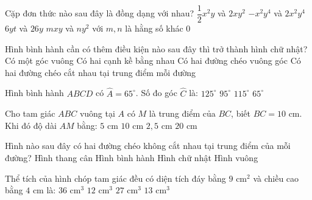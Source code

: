 \documentclass[12pt,a4paper]{article}
\begin{document}
\begin{ex}
Cặp đơn thức nào sau đây là đồng dạng với nhau?
\choice
{$\dfrac{1}{2}x^2y$ và $2xy^2$}
{\True $-x^2y^4$ và $2x^2y^4$}
{$6yt$ và $26y$}
{$mxy$ và $ny^2$ với $m, n$ là hằng số khác $0$}
\end{ex}

\begin{ex}
Hình bình hành cần có thêm điều kiện nào sau đây thì trở thành hình chữ nhật?
\choice
{\True Có một góc vuông}
{Có hai cạnh kề bằng nhau}
{Có hai đường chéo vuông góc}
{Có hai đường chéo cắt nhau tại trung điểm mỗi đường}
\end{ex}

\begin{ex}
Hình bình hành $ABCD$ có $\widehat{A} = 65^\circ$. Số đo góc $\widehat{C}$ là:
\choice
{$125^\circ$}
{$95^\circ$}
{$115^\circ$}
{\True $65^\circ$}
\end{ex}

\begin{ex}
Cho tam giác $ABC$ vuông tại $A$ có $M$ là trung điểm của $BC$, biết $BC = 10\text{ cm}$. Khi đó độ dài $AM$ bằng:
\choice
{\True $5\text{ cm}$}
{$10\text{ cm}$}
{$2{,}5\text{ cm}$}
{$20\text{ cm}$}
\end{ex}

\begin{ex}
Hình nào sau đây có hai đường chéo không cắt nhau tại trung điểm của mỗi đường?
\choice
{\True Hình thang cân}
{Hình bình hành}
{Hình chữ nhật}
{Hình vuông}
\end{ex}

\begin{ex}
Thể tích của hình chóp tam giác đều có diện tích đáy bằng $9\text{ cm}^2$ và chiều cao bằng $4\text{ cm}$ là:
\choice
{$36\text{ cm}^3$}
{\True $12\text{ cm}^3$}
{$27\text{ cm}^3$}
{$13\text{ cm}^3$}
\end{ex}
\end{document}
